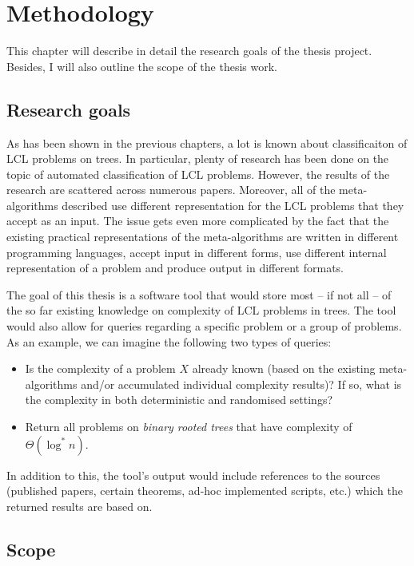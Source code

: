 \chapter{Methodology}
\label{chapter:methods}

This chapter will describe in detail the research goals of the thesis project. Besides, I will also outline the scope of the thesis work.

\section{Research goals}

As has been shown in the previous chapters, a lot is known about classificaiton
of LCL problems on trees. In particular, plenty of research has been done
on the topic of automated classification of LCL problems. However, the
results of the research are scattered across numerous papers. Moreover,
all of the meta-algorithms described use different representation for
the LCL problems that they accept as an input.
The issue gets even more complicated by the fact that the existing practical representations
of the meta-algorithms are written in different programming languages, accept input in
different forms,
use different internal representation of a problem and produce output in different
formats.

The goal of this thesis is a software tool that would store most -- if not all -- of
the so far existing knowledge on complexity of LCL problems in trees.
The tool would also allow for queries regarding a specific problem or a group of
problems. As an example, we can imagine the following two types of queries:
\begin{itemize}
  \item Is the complexity of a problem $X$ already known (based on the existing meta-algorithms
  and/or accumulated individual complexity results)? If so, what is the complexity in both
  deterministic and randomised settings?
  \item Return all problems on \emph{binary rooted trees} that have complexity of
  $\Theta(\log^* n)$.
\end{itemize}
In addition to this, the tool’s output would include references to
the sources
(published papers, certain theorems, ad-hoc implemented scripts, etc.)
which the returned results are based on.

\section{Scope}


